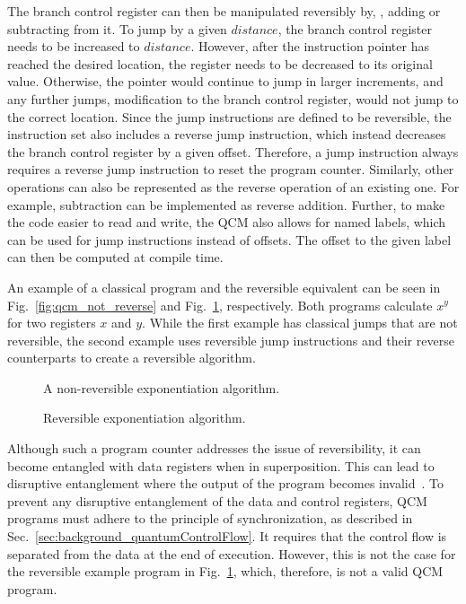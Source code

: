 The branch control register can then be manipulated reversibly by, \eg, adding or subtracting from it. To jump by a given $distance$, the branch control register needs to be increased to $distance$. However, after the instruction pointer has reached the desired location, the register needs to be decreased to its original value. Otherwise, the pointer would continue to jump in larger increments, and any further jumps, \ie modification to the branch control register, would not jump to the correct location. Since the jump instructions are defined to be reversible, the instruction set also includes a reverse jump instruction, which instead decreases the branch control register by a given offset. Therefore, a jump instruction always requires a reverse jump instruction to reset the program counter. Similarly, other operations can also be represented as the reverse operation of an existing one. For example, subtraction can be implemented as reverse addition. Further, to make the code easier to read and write, the QCM also allows for named labels, which can be used for jump instructions instead of offsets. The offset to the given label can then be computed at compile time. 

An example of a classical program and the reversible equivalent can be seen in Fig.~\ref{fig:qcm_not_reverse} and Fig.~\ref{fig:qcm_reverse}, respectively. Both programs calculate $x^y$ for two registers $x$ and $y$. While the first example has classical jumps that are not reversible, the second example uses reversible jump instructions and their reverse counterparts to create a reversible algorithm.

\begin{figure}[htp]
    \centering     
    \begin{minipage}{.40\textwidth}
        
        \caption{A non-reversible exponentiation algorithm.}
        \label{fig:qcm_not_reverse}
    \end{minipage}
    \hfill
    \begin{minipage}{.50\textwidth}
        
        \caption{Reversible exponentiation algorithm.}    
        \label{fig:qcm_reverse}
    \end{minipage}
\end{figure}

Although such a program counter addresses the issue of reversibility, it can become entangled with data registers when in superposition. This can lead to disruptive entanglement where the output of the program becomes invalid~\cite{YVC24}. To prevent any disruptive entanglement of the data and control registers, QCM programs must adhere to the principle of synchronization, as described in Sec.~\ref{sec:background_quantumControlFlow}. 
It requires that the control flow is separated from the data at the end of execution. However, this is not the case for the reversible example program in Fig.~\ref{fig:qcm_reverse}, which, therefore, is not a valid QCM program.

